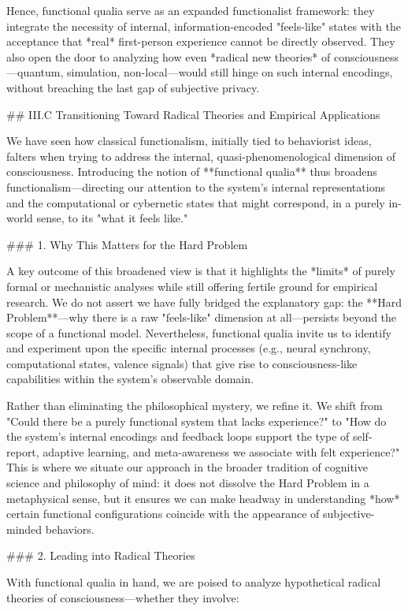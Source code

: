 Hence, functional qualia serve as an expanded functionalist framework: they integrate the necessity of internal, information-encoded "feels-like" states with the acceptance that *real* first-person experience cannot be directly observed. They also open the door to analyzing how even *radical new theories* of consciousness—quantum, simulation, non-local—would still hinge on such internal encodings, without breaching the last gap of subjective privacy.


## III.C Transitioning Toward Radical Theories and Empirical Applications

We have seen how classical functionalism, initially tied to behaviorist ideas, falters when trying to address the internal, quasi-phenomenological dimension of consciousness. Introducing the notion of **functional qualia** thus broadens functionalism—directing our attention to the system's internal representations and the computational or cybernetic states that might correspond, in a purely in-world sense, to its "what it feels like."

### 1. Why This Matters for the Hard Problem

A key outcome of this broadened view is that it highlights the *limits* of purely formal or mechanistic analyses while still offering fertile ground for empirical research. We do not assert we have fully bridged the explanatory gap: the **Hard Problem**—why there is a raw "feels-like" dimension at all—persists beyond the scope of a functional model. Nevertheless, functional qualia invite us to identify and experiment upon the specific internal processes (e.g., neural synchrony, computational states, valence signals) that give rise to consciousness-like capabilities within the system's observable domain.

Rather than eliminating the philosophical mystery, we refine it. We shift from "Could there be a purely functional system that lacks experience?" to "How do the system's internal encodings and feedback loops support the type of self-report, adaptive learning, and meta-awareness we associate with felt experience?" This is where we situate our approach in the broader tradition of cognitive science and philosophy of mind: it does not dissolve the Hard Problem in a metaphysical sense, but it ensures we can make headway in understanding *how* certain functional configurations coincide with the appearance of subjective-minded behaviors.

### 2. Leading into Radical Theories

With functional qualia in hand, we are poised to analyze hypothetical radical theories of consciousness—whether they involve:

